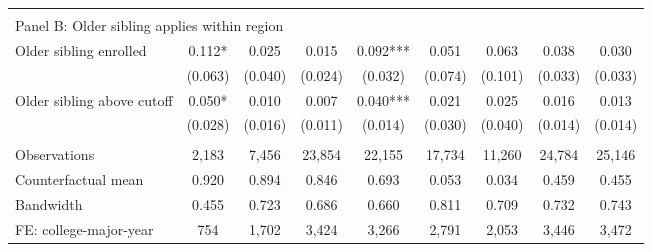 {{\begin{tabular}{lcccccccc}
&  &  &  & & & & & &    \\
\multicolumn{9}{l}{Panel B: Older sibling applies within region} \\
Older sibling enrolled&       0.112*  &       0.025   &       0.015   &       0.092***&       0.051   &       0.063   &       0.038   &       0.030   \\
                    &     (0.063)   &     (0.040)   &     (0.024)   &     (0.032)   &     (0.074)   &     (0.101)   &     (0.033)   &     (0.033)   \\
 
Older sibling above cutoff&       0.050*  &       0.010   &       0.007   &       0.040***&       0.021   &       0.025   &       0.016   &       0.013   \\
                    &     (0.028)   &     (0.016)   &     (0.011)   &     (0.014)   &     (0.030)   &     (0.040)   &     (0.014)   &     (0.014)   \\
                    &               &               &               &               &               &               &               &               \\
Observations        &       2,183   &       7,456   &      23,854   &      22,155   &      17,734   &      11,260   &      24,784   &      25,146   \\
Counterfactual mean &       0.920   &       0.894   &       0.846   &       0.693   &       0.053   &       0.034   &       0.459   &       0.455   \\
Bandwidth           &       0.455   &       0.723   &       0.686   &       0.660   &       0.811   &       0.709   &       0.732   &       0.743   \\
FE: college-major-year&         754   &       1,702   &       3,424   &       3,266   &       2,791   &       2,053   &       3,446   &       3,472   \\
 

\bottomrule
\end{tabular}
}
}
